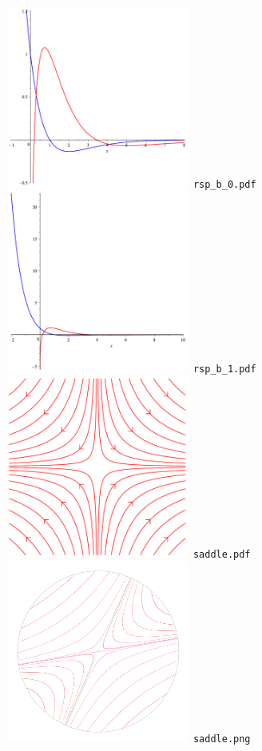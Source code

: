 \documentclass[a4paper]{amsart}
\begin{document}
\includegraphics[width=6cm]{rsp_b_0.pdf}\verb+ rsp_b_0.pdf+\\
\includegraphics[width=6cm]{rsp_b_1.pdf}\verb+ rsp_b_1.pdf+\\
\includegraphics[width=6cm]{saddle.pdf}\verb+ saddle.pdf+\\
\includegraphics[width=6cm]{saddle.png}\verb+ saddle.png+\\
\end{document}
